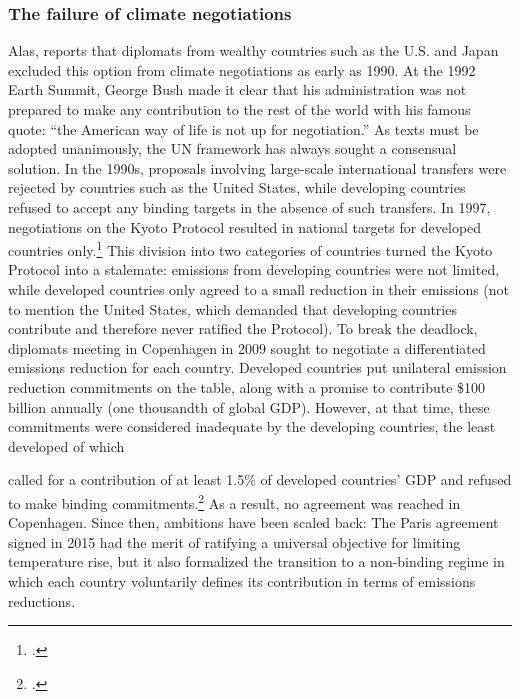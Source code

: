 \documentclass[a5paper,english,openany]{memoir}
\begin{document}
\subsubsection*{The failure of climate negotiations}
Alas, \citet{bertram_tradeable_1992} reports that diplomats from wealthy countries such as the U.S. and Japan excluded %
this option from climate negotiations as early as 1990. At the 1992 Earth Summit, George Bush made it clear that his administration was not prepared to make any contribution to the rest of the world with his famous quote: ``the American way of life is not up for negotiation.'' %
As texts must be adopted unanimously, the UN framework has always sought a consensual solution. In the 1990s, proposals involving large-scale international transfers were rejected by countries such as the United States, while developing countries refused to accept any binding targets in the absence of such transfers. In 1997, negotiations on the Kyoto Protocol resulted in national targets for developed countries only.\footnote{\citet{gupta_history_2010}.} This division into two categories of countries turned the Kyoto Protocol into a stalemate: emissions from developing countries were not limited, while developed countries only agreed to a small reduction in their emissions (not to mention the United States, which demanded that developing countries contribute and therefore never ratified the Protocol). To break the deadlock, diplomats meeting in Copenhagen in 2009 sought to negotiate a differentiated emissions reduction for each country. Developed countries put unilateral emission reduction commitments on the table, along with a promise to contribute \$100 billion annually (one thousandth of global GDP). However, at that time, %
these commitments were considered inadequate by the developing countries, %
the least developed of which %

called for a contribution of at least 1.5\% of developed countries' GDP and refused to make binding commitments.\footnote{\citet{dimitrov_inside_2010}.} As a result, no agreement was reached in Copenhagen. Since then, ambitions have been scaled back: %
The Paris agreement signed in 2015 had the merit of ratifying a universal objective for limiting temperature rise, but it also formalized %
the transition to a non-binding regime in which each country voluntarily defines its contribution in terms of emissions reductions. 
\end{document}
